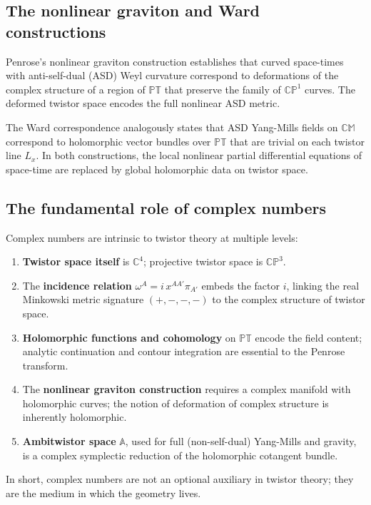 \documentclass[12pt]{article}
\begin{document}
\subsection{The nonlinear graviton and Ward constructions}\label{sec:nonlinear}

Penrose's nonlinear graviton construction \cite{Pen76} establishes that curved
space-times with anti-self-dual (ASD) Weyl curvature correspond to deformations of
the complex structure of a region of $\mathbb{PT}$ that preserve the family of
$\mathbb{CP}^1$ curves.  The deformed twistor space encodes the full nonlinear ASD
metric.

The Ward correspondence \cite{Ward77} analogously states that ASD Yang-Mills fields on
$\mathbb{CM}$ correspond to holomorphic vector bundles over $\mathbb{PT}$ that are
trivial on each twistor line $L_x$.  In both constructions, the local nonlinear partial
differential equations of space-time are replaced by global holomorphic data on twistor
space.

\subsection{The fundamental role of complex numbers}\label{sec:complex}

Complex numbers are intrinsic to twistor theory at multiple levels:
\begin{enumerate}
  \item \textbf{Twistor space itself} is $\mathbb{C}^4$; projective twistor space is
        $\mathbb{CP}^3$.
  \item The \textbf{incidence relation} $\omega^A = i\,x^{AA'}\pi_{A'}$ embeds the
        factor $i$, linking the real Minkowski metric signature $(+,-,-,-)$ to the
        complex structure of twistor space.
  \item \textbf{Holomorphic functions and cohomology} on $\mathbb{PT}$ encode the field
        content; analytic continuation and contour integration are essential to the
        Penrose transform.
  \item The \textbf{nonlinear graviton construction} requires a complex manifold with
        holomorphic curves; the notion of deformation of complex structure is inherently
        holomorphic.
  \item \textbf{Ambitwistor space} $\mathbb{A}$, used for full (non-self-dual)
        Yang-Mills and gravity, is a complex symplectic reduction of the holomorphic
        cotangent bundle.
\end{enumerate}
In short, complex numbers are not an optional auxiliary in twistor theory; they are
the medium in which the geometry lives.
\end{document}
